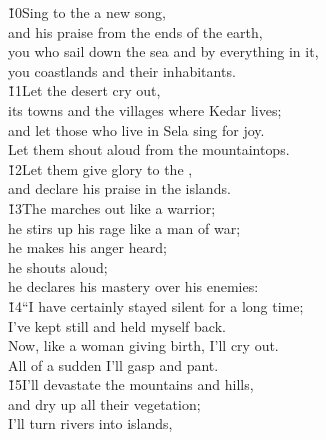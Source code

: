 \begin{poetry}
\poeml \v{10}Sing to the  a new song, \\
\poemll    and his praise from the ends of the earth, \\
\poeml you who sail down the sea and by everything in it, \\
\poemll    you coastlands and their inhabitants. \\
\poeml \v{11}Let the desert cry out, \\
\poemll    its towns and the villages where Kedar lives; \\
\poeml and let those who live in Sela sing for joy. \\
\poemll    Let them shout aloud from the mountaintops. \\
\poeml \v{12}Let them give glory to the , \\
\poemll    and declare his praise in the islands. \\
\poeml \v{13}The  marches out like a warrior; \\
\poemll    he stirs up his rage like a man of war; \\
\poeml he makes his anger heard; \\
\poemll    he shouts aloud; \\
\poemlll       he declares his mastery over his enemies: \\
\poeml \v{14}``I have certainly stayed silent for a long time; \\
\poemll    I've kept still and held myself back. \\
\poeml Now, like a woman giving birth, I'll cry out. \\
\poemll    All of a sudden I'll gasp and pant. \\
\poeml \v{15}I'll devastate the mountains and hills, \\
\poemll    and dry up all their vegetation; \\
\poeml I'll turn rivers into islands, \\

\end{poetry}
